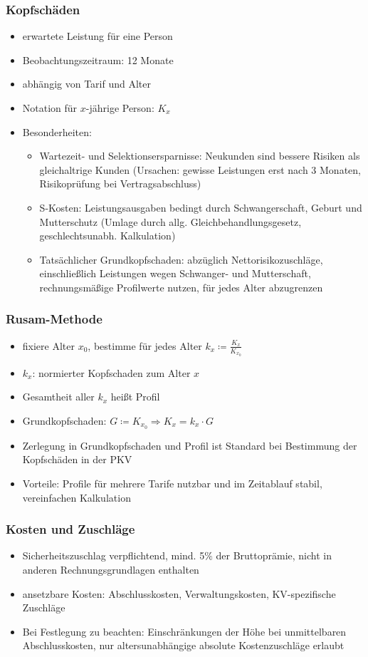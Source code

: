 \documentclass[12pt]{report}
\theoremstyle{dotless}
\theoremstyle{definition}
\begin{document}
\subsubsection{Kopfschäden}
\begin{itemize}
	\item erwartete Leistung für eine Person
	\item Beobachtungszeitraum: 12 Monate
	\item abhängig von Tarif und Alter
	\item Notation für $x$-jährige Person: $K_x$
	\item Besonderheiten:
		\begin{itemize}
			\item Wartezeit- und Selektionsersparnisse: Neukunden sind bessere Risiken als gleichaltrige Kunden (Ursachen: gewisse Leistungen erst nach 3 Monaten, Risikoprüfung bei Vertragsabschluss)
			\item S-Kosten: Leistungsausgaben bedingt durch Schwangerschaft, Geburt und Mutterschutz (Umlage durch allg. Gleichbehandlungsgesetz, geschlechtsunabh. Kalkulation)
			\item Tatsächlicher Grundkopfschaden: abzüglich Nettorisikozuschläge, einschlie{\ss}lich Leistungen wegen Schwanger- und Mutterschaft, rechnungsmä{\ss}ige Profilwerte nutzen, für jedes Alter abzugrenzen
		\end{itemize}
\end{itemize}

\subsubsection{Rusam-Methode}
\begin{itemize}
	\item fixiere Alter $x_0$, bestimme für jedes Alter $k_x \coloneqq \frac{K_x}{K_{x_0}}$
	\item $k_x$: normierter Kopfschaden zum Alter $x$
	\item Gesamtheit aller $k_x$ hei{\ss}t Profil
	\item Grundkopfschaden: $G \coloneqq K_{x_0} \Rightarrow K_x=k_x \cdot G$
	\item Zerlegung in Grundkopfschaden und Profil ist Standard bei Bestimmung der Kopfschäden in der PKV
	\item Vorteile: Profile für mehrere Tarife nutzbar und im Zeitablauf stabil, vereinfachen Kalkulation
\end{itemize}

\subsubsection{Kosten und Zuschläge}
\begin{itemize}
	\item Sicherheitszuschlag verpflichtend, mind. 5$\%$ der Bruttoprämie, nicht in anderen Rechnungsgrundlagen enthalten
	\item ansetzbare Kosten: Abschlusskosten, Verwaltungskosten, KV-spezifische Zuschläge
	\item Bei Festlegung zu beachten: Einschränkungen der Höhe bei unmittelbaren Abschlusskosten, nur altersunabhängige absolute Kostenzuschläge erlaubt
\end{itemize}
\end{document}
